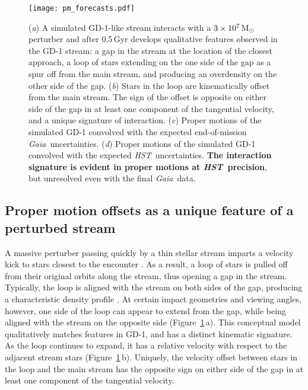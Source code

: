 \documentclass[12pt]{article}
\newcommand{\hst}{\textsl{HST}}
\newcommand{\gaia}{\textsl{Gaia}}
\begin{document}
\begin{figure}
\begin{center}
\texttt{[image: pm\_forecasts.pdf]}
\end{center}
\caption{
(\emph{a}) A simulated GD-1-like stream interacts with a $3\times10^7\,\rm M_\odot$ perturber and after 0.5\,Gyr develops qualitative features observed in the GD-1 stream: a gap in the stream at the location of the closest approach, a loop of stars extending on the one side of the gap as a spur off from the main stream, and producing an overdensity on the other side of the gap.
(\emph{b}) Stars in the loop are kinematically offset from the main stream.
The sign of the offset is opposite on either side of the gap in at least one component of the tangential velocity, and a unique signature of interaction.
(\emph{c}) Proper motions of the simulated GD-1 convolved with the expected end-of-mission \gaia\ uncertainties.
(\emph{d}) Proper motions of the simulated GD-1 convolved with the expected \hst\ uncertainties.
{\bf The interaction signature is evident in proper motions at \hst\ precision}, but unresolved even with the final \gaia\ data.
}
\label{fig:fiducial}
\end{figure}

\subsection*{Proper motion offsets as a unique feature of a perturbed stream}
A massive perturber passing quickly by a thin stellar stream imparts a velocity kick to stars closest to the encounter \parencite[e.g.,][]{erkal2015}.
As a result, a loop of stars is pulled off from their original orbits along the stream, thus opening a gap in the stream.
Typically, the loop is aligned with the stream on both sides of the gap, producing a characteristic density profile \parencite[e.g.,][]{carlberg2013}.
At certain impact geometries and viewing angles, however, one side of the loop can appear to extend from the gap, while being aligned with the stream on the opposite side (Figure~\ref{fig:fiducial}\,a).
This conceptual model qualitatively matches features in GD-1, and has a distinct kinematic signature.
As the loop continues to expand, it has a relative velocity with respect to the adjacent stream stars (Figure~\ref{fig:fiducial}\,b).
Uniquely, the velocity offset between stars in the loop and the main stream has the opposite sign on either side of the gap in at least one component of the tangential velocity.
\end{document}
